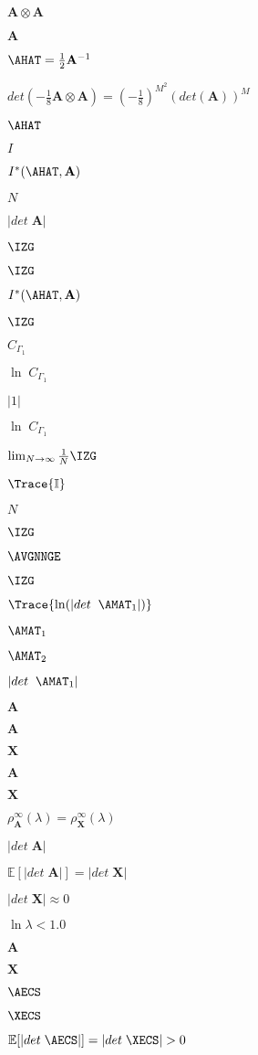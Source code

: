 $\mathbf{A} \otimes \mathbf{A}$

$\mathbf{A}$

$\AHAT=\tfrac{1}{2}\mathbf{A}^{-1}$

$ det \left( -\frac{1}{8} \mathbf{A} \otimes \mathbf{A} \right) = \left( -\frac{1}{8} \right)^{M^2} \left(  det (\mathbf{A}) \right)^M$

$\AHAT$

$I$

$I^{*}(\AHAT,\mathbf{A})$

$N$

$|det\;\mathbf{A}|$

$\IZG$

$\IZG$

$I^{*}(\AHAT,\mathbf{A})$

$\IZG$

$C_{\Gamma_1}$

$\ln\;C_{\Gamma_1} $

$|1|$

$\ln\;C_{\Gamma_1}$

$\lim_{N\rightarrow\infty}\tfrac{1}{N}\IZG$

$\Trace{\mathbb{I}}$

$N$

$\IZG$

$\AVGNNGE$

$\IZG$

$\Trace{\ln(|det\;\;\AMAT_{1}|)}$

$\AMAT_{1}$

$\AMAT_{2}$

$|det\;\;\AMAT_{1}|$

$\mathbf{A}$

$\mathbf{A}$

$\mathbf{X}$

$\mathbf{A}$

$\mathbf{X}$

$\rho^{\infty}_{\mathbf{A}}(\lambda)=\rho^{\infty}_{\mathbf{X}}(\lambda)$

$|det\;\mathbf{A}|$

$\mathbb{E}[|det\;\mathbf{A}|]=|det\;\mathbf{X}|$

$|det\;\mathbf{X}|\approx 0$

$\ln\lambda<1.0$

$\mathbf{A}$

$\mathbf{X}$

$\AECS$

$\XECS$

$\mathbb{E}[|det\;\AECS|]=|det\;\XECS|>0$

